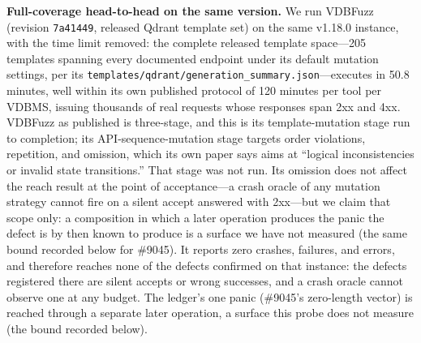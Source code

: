 \documentclass[acmsmall,screen,review,anonymous]{acmart}
\begin{document}
\textbf{Full-coverage head-to-head on the same version.} We run VDBFuzz (revision \texttt{7a41449}, released Qdrant template set) on the same v1.18.0 instance, with the time limit removed: the complete released template space---205 templates spanning every documented endpoint under its default mutation settings, per its \texttt{templates/qdrant/generation\_summary.json}---executes in 50.8\,minutes, well within its own published protocol of 120 minutes per tool per VDBMS, issuing thousands of real requests whose responses span 2xx and 4xx. VDBFuzz as published is three-stage, and this is its template-mutation stage run to completion; its API-sequence-mutation stage targets order violations, repetition, and omission, which its own paper says aims at ``logical inconsistencies or invalid state transitions.'' That stage was not run. Its omission does not affect the reach result at the point of acceptance---a crash oracle of any mutation strategy cannot fire on a silent accept answered with 2xx---but we claim that scope only: a composition in which a later operation produces the panic the defect is by then known to produce is a surface we have not measured (the same bound recorded below for \#9045). It reports zero crashes, failures, and errors, and therefore reaches none of the defects confirmed on that instance: the defects registered there are silent accepts or wrong successes, and a crash oracle cannot observe one at any budget. The ledger's one panic (\#9045's zero-length vector) is reached through a separate later operation, a surface this probe does not measure (the bound recorded below).
\end{document}
